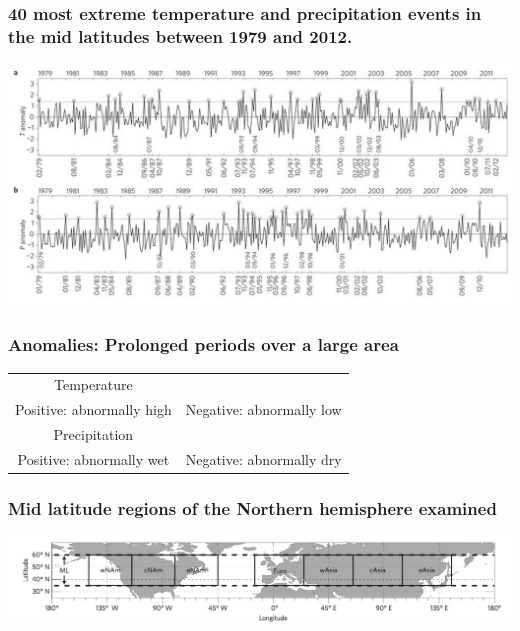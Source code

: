 \documentclass[12pt]{beamer}
\begin{document}
\begin{frame}
\frametitle{40 most extreme temperature and precipitation events in the mid latitudes between 1979 and 2012.}
\centering
\includegraphics[scale=0.53]{Cathie1}


\end{frame}
\begin{frame}
\frametitle{Anomalies: Prolonged periods over a large area}
\begin{tabular}{c c}
\Large{Temperature}&\vspace{5pt}\\

\large{Positive: abnormally high}	&	\large{Negative: abnormally low}\vspace{20pt}\\

\Large{Precipitation}&\vspace{5pt}\\
\large{Positive: abnormally wet} &		\large{Negative: abnormally dry}\\
\end{tabular}
\end{frame}
\begin{frame}
\frametitle{Mid latitude regions of the Northern hemisphere examined}
\centering
\includegraphics[scale=0.3]{Cathie2}
\end{frame}
\end{document}
